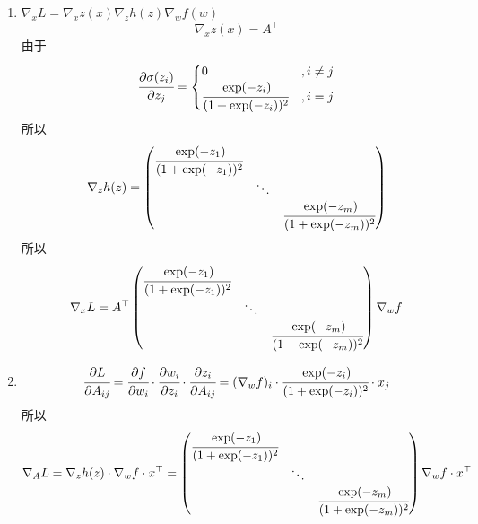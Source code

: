 \documentclass[11pt,letter,notitlepage]{article}
\begin{document}
\begin{solution}
	\begin{enumerate}
		\item $\nabla_x L = \nabla_x z(x) \nabla_z h(z) \nabla_w f(w)$
		      $$\nabla_x z(x)=A^\top$$
		      由于
		      $$\cfrac{\partial \sigma(z_i)}{\partial z_j}=\begin{cases}
				      0                                    & ,i \neq j \\
				      \cfrac{\exp(-z_i)}{(1+\exp(-z_i))^2} & ,i=j
			      \end{cases}$$
		      所以
		      $$\nabla_z h(z)=\begin{pmatrix}
				      \cfrac{\exp(-z_1)}{(1+\exp(-z_1))^2} &        &                                      \\
				                                           & \ddots &                                      \\
				                                           &        & \cfrac{\exp(-z_m)}{(1+\exp(-z_m))^2}
			      \end{pmatrix}$$
		      所以
		      $$\nabla_x L= A^\top\begin{pmatrix}
				      \cfrac{\exp(-z_1)}{(1+\exp(-z_1))^2} &        &                                      \\
				                                           & \ddots &                                      \\
				                                           &        & \cfrac{\exp(-z_m)}{(1+\exp(-z_m))^2}
			      \end{pmatrix}\nabla_w f$$
		\item $$\cfrac{\partial L}{\partial A_{ij}}=\cfrac{\partial f}{\partial w_i}\cdot\cfrac{\partial w_i}{\partial z_i}\cdot\cfrac{\partial z_i}{\partial A_{ij}}
			      =(\nabla_w f)_i\cdot \cfrac{\exp(-z_i)}{(1+\exp(-z_i))^2}\cdot x_j$$
		      所以
		      $$\nabla_A L = \nabla_z h(z)\cdot\nabla_w f\cdot x^\top=
			      \begin{pmatrix}
				      \cfrac{\exp(-z_1)}{(1+\exp(-z_1))^2} &        &                                      \\
				                                           & \ddots &                                      \\
				                                           &        & \cfrac{\exp(-z_m)}{(1+\exp(-z_m))^2}
			      \end{pmatrix}\nabla_w f \cdot x^\top$$
	\end{enumerate}
\end{solution}



\end{document}
